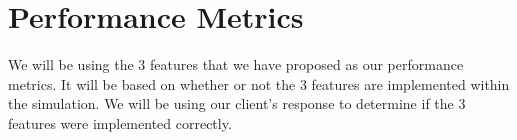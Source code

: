 \documentclass[10pt,journal,compsoc]{IEEEtran}
\begin{document}
\section{Performance Metrics}
We will be using the 3 features that we have proposed as our performance metrics. 
It will be based on whether or not the 3 features are implemented within the 
simulation. We will be using our client’s response to determine if the 3 
features were implemented correctly.
\end{document}
